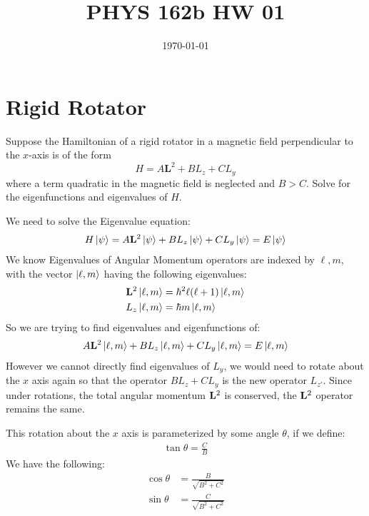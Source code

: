 \documentclass[12pt]{article}
\title{\vspace{-3em}PHYS 162b HW 01}
\date{\today}
\begin{document}
\maketitle
\section{Rigid Rotator}
\begin{problem}
Suppose the Hamiltonian of a rigid rotator in a magnetic field perpendicular to the $x$-axis is of the form
\[
H=A \mathbf{L}^2+B L_z+C L_y
\]
where a term quadratic in the magnetic field is neglected and $B>C$. Solve for the eigenfunctions and eigenvalues of $H$.

\end{problem}
We need to solve the Eigenvalue equation:
\begin{align*}
  H\ket{\psi}=A\vb{L}^2\ket{\psi}+BL_z\ket{\psi}+CL_y\ket{\psi}=E\ket{\psi}
\end{align*}
We know Eigenvalues of Angular Momentum operators are indexed by $\ell,m$, with the vector $\ket{\ell,m}$ having the following eigenvalues:
\begin{align*}
  \vb{L}^2\ket{\ell,m}&=\hbar^2\ell(\ell+1)\ket{\ell,m}\\
  L_z\ket{\ell,m}&=\hbar m\ket{\ell,m}
\end{align*}
So we are trying to find eigenvalues and eigenfunctions of:
\begin{align*}
  A\vb{L}^2\ket{\ell,m}+BL_z\ket{\ell,m}+CL_y\ket{\ell,m}=E\ket{\ell,m}
\end{align*}
However we cannot directly find eigenvalues of $L_y$, we would need to rotate about the $x$ axis again so that the operator $BL_z+CL_y$ is the new operator $L_{z'}$. Since under rotations, the total angular momentum $\vb{L}^2$ is conserved, the $\vb{L}^2$ operator remains the same.

This rotation about the $x$ axis is parameterized by some angle $\theta$, if we define:
\begin{align*}
  \tan\theta=\frac{C}{B}
\end{align*}
We have the following:
\begin{align*}
  \cos\theta&=\frac{B}{\sqrt{B^2+C^2}}\\
  \sin\theta&=\frac{C}{\sqrt{B^2+C^2}}
\end{align*}
\end{document}
